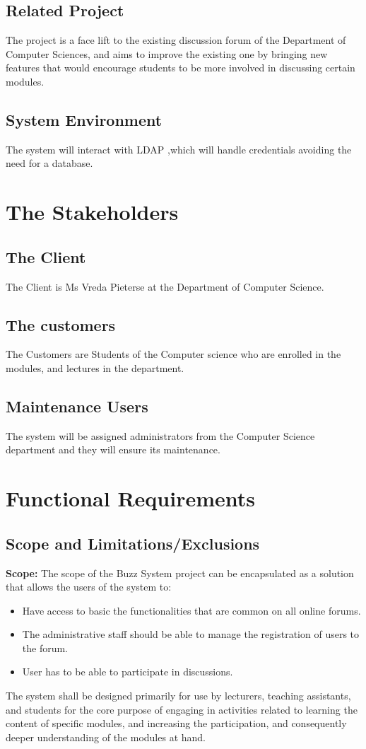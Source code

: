 \documentclass[11pt]{article}
\begin{document}
\subsection{Related Project}
The project is a face lift to the existing discussion forum of the Department of Computer Sciences, and aims to improve the existing one by bringing new features that would encourage students to be more involved in discussing certain modules.
\subsection{System Environment}
The system will interact with LDAP ,which will handle credentials avoiding the need for a database.

\section{The Stakeholders}

\subsection{The Client}
The Client is Ms Vreda Pieterse at the Department of Computer Science.
\subsection{The customers}
The Customers are Students of the Computer science who are enrolled in the modules, and lectures in the department.
\subsection{Maintenance Users}
The system will be assigned administrators from the Computer Science department and they will ensure its maintenance.

\newpage
\section{Functional Requirements}
\subsection{Scope and Limitations/Exclusions}
\textbf{Scope: } \newline
The scope of the Buzz System project can be encapsulated as a solution that allows the users of the system to:
\begin{itemize}
\item Have access to basic the functionalities that are common on all online forums.
\item The administrative staff should be able to manage the registration of users to the forum.
\item User has to be able to participate in discussions. 
\end{itemize}
The system shall be designed primarily for use by lecturers, teaching
assistants, and students for the core purpose of engaging in activities related to learning the content of specific modules, and increasing the participation, and consequently deeper understanding of the modules at hand. \newline
\end{document}
